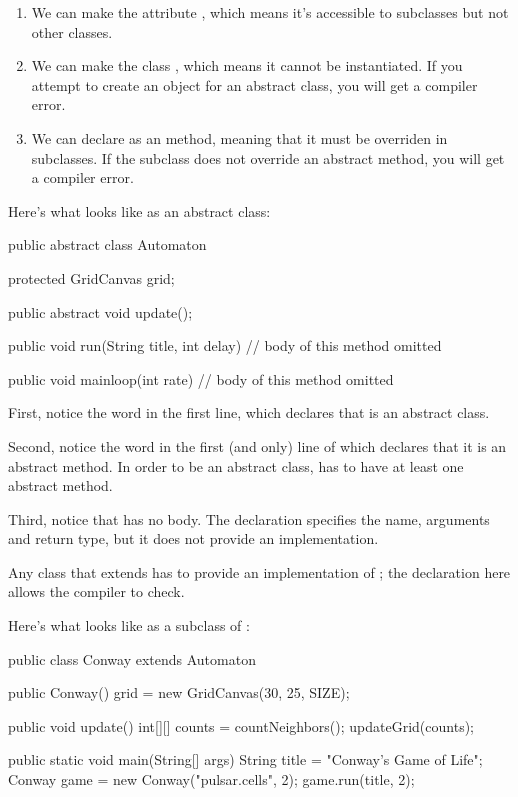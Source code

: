 \begin{enumerate}

\item We can make the  attribute , which means it's accessible to subclasses but not other classes.

\item We can make the class , which means it cannot be instantiated.
If you attempt to create an object for an abstract class, you will get a compiler error.

\item We can declare  as an  method, meaning that it must be overriden in subclasses.
If the subclass does not override an abstract method, you will get a compiler error.
\end{enumerate}

Here's what  looks like as an abstract class:

\begin{code}
public abstract class Automaton {
    protected GridCanvas grid;

    public abstract void update();

    public void run(String title, int delay) {
        // body of this method omitted
    }

    public void mainloop(int rate) {
        // body of this method omitted
    }
}
\end{code}

First, notice the word  in the first line, which declares that  is an abstract class.

Second, notice the word  in the first (and only) line of  which declares that it is an abstract method.
In order to be an abstract class,  has to have at least one abstract method.

Third, notice that  has no body.
The declaration specifies the name, arguments and return type, but it does not provide an implementation.

Any class that extends  has to provide an implementation of ; the declaration here allows the compiler to check.

Here's what  looks like as a subclass of :

\begin{code}
public class Conway extends Automaton {

    public Conway() {
        grid = new GridCanvas(30, 25, SIZE);
    }

    public void update() {
        int[][] counts = countNeighbors();
        updateGrid(counts);
    }

    public static void main(String[] args) {
        String title = "Conway's Game of Life";
        Conway game = new Conway("pulsar.cells", 2);
        game.run(title, 2);
    }
}
\end{code}


